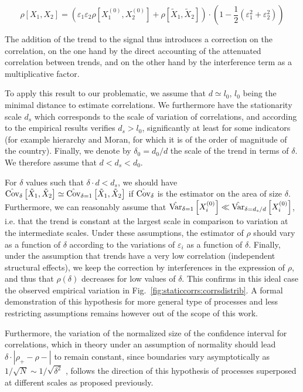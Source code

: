 \begin{equation}
	\rho\left[X_1,X_2\right] = \left( \varepsilon_1 \varepsilon_2\rho\left[X_1^{(0)},X_2^{(0)}\right] + \rho\left[\tilde{X}_1,\tilde{X}_2\right]\right)\cdot\left(1 - \frac{1}{2}(\varepsilon_1^2 + \varepsilon_2^2)\right)
\end{equation}

The addition of the trend to the signal thus introduces a correction on the correlation, on the one hand by the direct accounting of the attenuated correlation between trends, and on the other hand by the interference term as a multiplicative factor.

To apply this result to our problematic, we assume that $d \simeq l_0$, $l_0$ being the minimal distance to estimate correlations. We furthermore have the stationarity scale $d_s$ which corresponds to the scale of variation of correlations, and according to the empirical results verifies $d_s > l_0$, significantly at least for some indicators (for example hierarchy and Moran, for which it is of the order of magnitude of the country). Finally, we denote by $\delta_0 = d_0/d$ the scale of the trend in terms of $\delta$. We therefore assume that $d < d_s < d_0$.

For $\delta$ values such that $\delta \cdot d < d_s$, we should have $\hat{\operatorname{Cov}}_{\delta}\left[\tilde{X}_1,\tilde{X}_2\right] \simeq \hat{\operatorname{Cov}}_{\delta = 1}\left[\tilde{X}_1,\tilde{X}_2\right]$ if $\hat{\operatorname{Cov}}_{\delta}$ is the estimator on the area of size $\delta$. Furthermore, we can reasonably assume that $\hat{\operatorname{Var}}_{\delta = 1}\left[X_i^{(0)}\right] \ll \hat{\operatorname{Var}}_{\delta = d_s / d}\left[X_i^{(0)}\right]$, i.e. that the trend is constant at the largest scale in comparison to variation at the intermediate scales. Under these assumptions, the estimator of $\rho$ should vary as a function of $\delta$ according to the variations of $\varepsilon_i$ as a function of $\delta$. Finally, under the assumption that trends have a very low correlation (independent structural effects), we keep the correction by interferences in the expression of $\rho$, and thus that $\rho(\delta)$ decreases for low values of $\delta$. This confirms in this ideal case the observed empirical variation in Fig.~\ref{fig:staticcorrs:corrsdistrib}. A formal demonstration of this hypothesis for more general type of processes and less restricting assumptions remains however out of the scope of this work.


Furthermore, the variation of the normalized size of the confidence interval for correlations, which in theory under an assumption of normality should lead $\delta\cdot \left|\rho_+ - \rho -\right|$ to remain constant, since boundaries vary asymptotically as $1/\sqrt{N}\sim 1/\sqrt{\delta^2}$ , follows the direction of this hypothesis of processes superposed at different scales as proposed previously.


